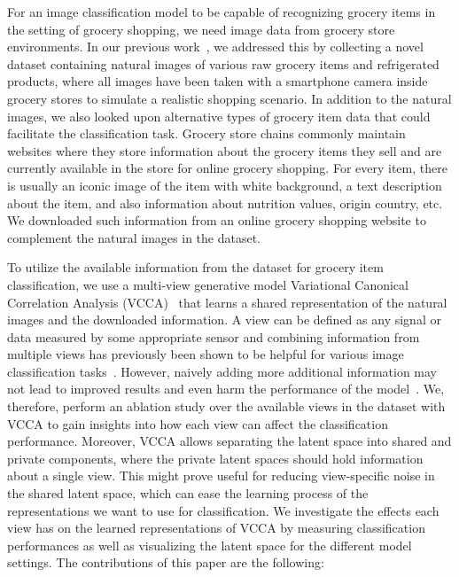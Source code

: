 

For an image classification model to be capable of recognizing grocery items in the setting of grocery shopping, we need image data from grocery store environments. 
In our previous work~, we addressed this by collecting a novel dataset containing natural images of various raw grocery items and refrigerated products, where all images have been taken with a smartphone camera inside grocery stores to simulate a realistic shopping scenario.
In addition to the natural images, we also looked upon alternative types of grocery item data that could facilitate the classification task.
Grocery store chains commonly maintain websites where they store information about the grocery items they sell and are currently available in the store for online grocery shopping. 
For every item, there is usually an iconic image of the item with white background, a text description about the item, and also information about nutrition values, origin country, etc.
We downloaded such information from an online grocery shopping website to complement the natural images in the dataset.

To utilize the available information from the dataset for grocery item classification, we use a multi-view generative model Variational Canonical Correlation Analysis (VCCA)~ that learns a shared representation of the natural images and the downloaded information. A view can be defined as any signal or data measured by some appropriate sensor and combining information from multiple views has previously been shown to be helpful for various image classification tasks~. However, naively adding more additional information may not lead to improved results and even harm the performance of the model~. We, therefore, perform an ablation study over the available views in the dataset with VCCA to gain insights into how each view can affect the classification performance. Moreover, VCCA allows separating the latent space into shared and private components, where the private latent spaces should hold information about a single view. This might prove useful for reducing view-specific noise in the shared latent space, which can ease the learning process of the representations we want to use for classification. We investigate the effects each view has on the learned representations of VCCA by measuring classification performances as well as visualizing the latent space for the different model settings. The contributions of this paper are the following:


